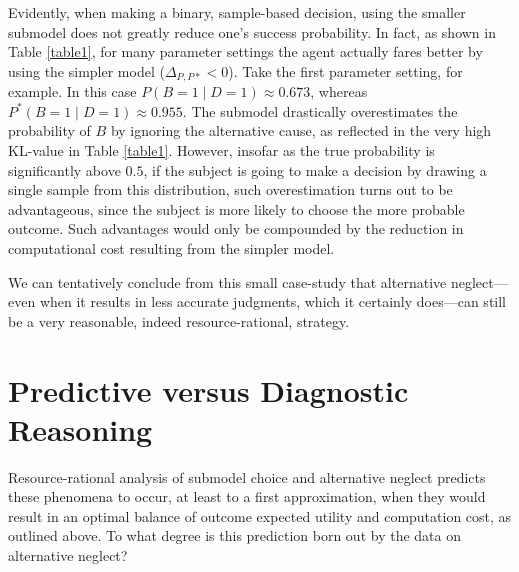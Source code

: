\documentclass[10pt,letterpaper]{article}
\begin{document}
Evidently, when making a binary, sample-based decision, using the smaller submodel does not greatly reduce one's success probability. In fact, as shown in Table \ref{table1}, for many parameter settings the agent actually fares better by using the simpler model ($\Delta_{P,P*}<0$). Take the first parameter setting, for example. In this case $P(B=1\mid D=1) \approx 0.673$, whereas $P^*(B=1 \mid D=1) \approx 0.955$. The submodel drastically overestimates the probability of $B$ by ignoring the alternative cause, as reflected in the very high KL-value in Table \ref{table1}. However, insofar as the true probability is significantly above $0.5$, if the subject is going to make a decision by drawing a single sample from this distribution, such overestimation turns out to be advantageous, since the subject is more likely to choose the more probable outcome. Such advantages would only be compounded by the reduction in computational cost resulting from the simpler model.

We can tentatively conclude from this small case-study that alternative neglect---even when it results in less accurate judgments, which it certainly does---can still be a very reasonable, indeed resource-rational, strategy. 

\section{Predictive versus Diagnostic Reasoning}

Resource-rational analysis of submodel choice and alternative neglect predicts these phenomena to occur, at least to a first approximation, when they would result in 
an optimal balance of outcome expected utility and computation cost,
as outlined above. To what degree is this prediction born out by the data on alternative neglect?
\end{document}
